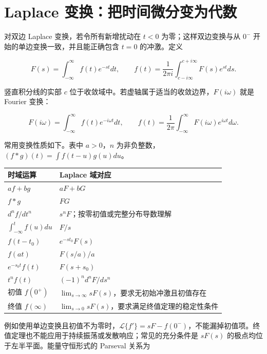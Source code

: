 \documentclass[
  11pt,
  a4paper,
  oneside,
  openany]{report}
\numberwithin{equation}{chapter}
\begin{document}
\section{Laplace 变换：把时间微分变为代数}\label{sec-laplace}

对双边 Laplace 变换，若令所有新增扰动在 \(t<0\) 为零；这样双边变换与从
\(0^-\) 开始的单边变换一致，并且能正确包含 \(t=0\) 的冲激。定义

\begin{equation}
F(s)=\int_{-\infty}^{\infty}f(t)e^{-st}dt,
\qquad
f(t)=\frac{1}{2\pi i}\int_{c-i\infty}^{c+i\infty}F(s)e^{st}ds.
\end{equation}

竖直积分线的实部 \(c\)
位于收敛域中。若虚轴属于适当的收敛边界，\(F(i\omega)\) 就是 Fourier
变换：

\begin{equation}
F(i\omega)=\int_{-\infty}^{\infty}f(t)e^{-i\omega t}dt,
\qquad
f(t)=\frac{1}{2\pi}\int_{-\infty}^{\infty}F(i\omega)e^{i\omega t}d\omega.
\end{equation}

常用变换性质如下。表中 \(a>0\)，\(n\)
为非负整数，\((f*g)(t)=\int f(t-u)g(u)du\)。

\begin{longtable}[]{@{}ll@{}}
\toprule\noalign{}
时域运算 & Laplace 域对应 \\
\midrule\noalign{}
\endhead
\bottomrule\noalign{}
\endlastfoot
\(af+bg\) & \(aF+bG\) \\
\(f*g\) & \(FG\) \\
\(d^nf/dt^n\) & \(s^nF\)；按零初值或完整分布导数理解 \\
\(\int_{-\infty}^{t}f(u)du\) & \(F/s\) \\
\(f(t-t_0)\) & \(e^{-st_0}F(s)\) \\
\(f(at)\) & \(F(s/a)/a\) \\
\(e^{-s_0t}f(t)\) & \(F(s+s_0)\) \\
\(t^nf(t)\) & \((-1)^nd^nF/ds^n\) \\
初值 \(f(0^+)\) &
\(\lim_{s\to\infty}sF(s)\)，要求无初始冲激且初值存在 \\
终值 \(f(\infty)\) &
\(\lim_{s\to0}sF(s)\)，要求满足终值定理的稳定性条件 \\
\end{longtable}

例如使用单边变换且初值不为零时，\(\mathcal L\{f'\}=sF-f(0^-)\)，不能漏掉初值项。终值定理也不能应用于持续振荡或发散响应；常见的充分条件是
\(sF(s)\) 的极点均位于左半平面。能量守恒形式的 Parseval 关系为
\end{document}
